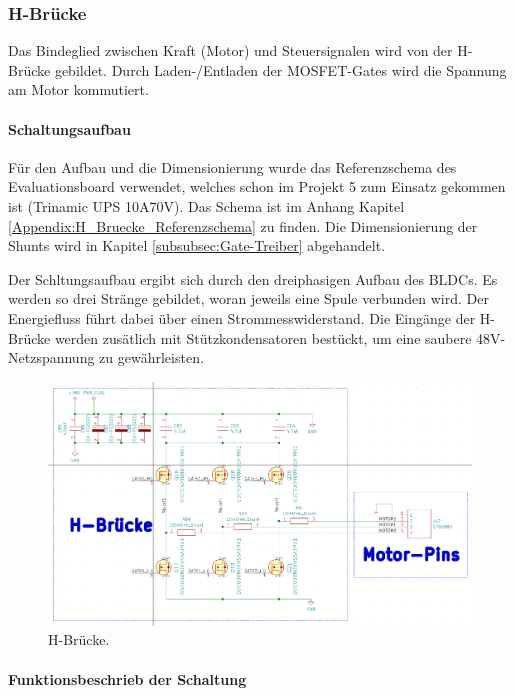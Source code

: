 \subsubsection{H-Brücke}
\label{subsubsec:H-Brücke}

Das Bindeglied zwischen Kraft (Motor) und Steuersignalen wird von der H-Brücke gebildet. Durch Laden-/Entladen der MOSFET-Gates wird die Spannung am Motor kommutiert.

\paragraph{Schaltungsaufbau}\mbox{}

Für den Aufbau und die Dimensionierung wurde das Referenzschema des Evaluationsboard verwendet, welches schon im Projekt 5 zum Einsatz gekommen ist (Trinamic UPS 10A70V). Das Schema ist im Anhang Kapitel \ref{Appendix:H_Bruecke_Referenzschema} zu finden. Die Dimensionierung der Shunts wird in Kapitel \ref{subsubsec:Gate-Treiber} abgehandelt.

Der Schltungsaufbau ergibt sich durch den dreiphasigen Aufbau des BLDCs. Es werden so drei Stränge gebildet, woran jeweils eine Spule verbunden wird. Der Energiefluss führt dabei über einen Strommesswiderstand. Die Eingänge der H-Brücke werden zusätlich mit Stützkondensatoren bestückt, um eine saubere 48V-Netzspannung zu gewährleisten.

\begin{figure}[H]
	\centering
	\includegraphics[width=\textwidth]{graphics/Schema_H_Bruecke_und_BLDC}
	\caption{H-Brücke.}
	\label{fig:Schema_H_Bruecke_und_BLDC}
\end{figure}

\paragraph{Funktionsbeschrieb der Schaltung}\mbox{}

